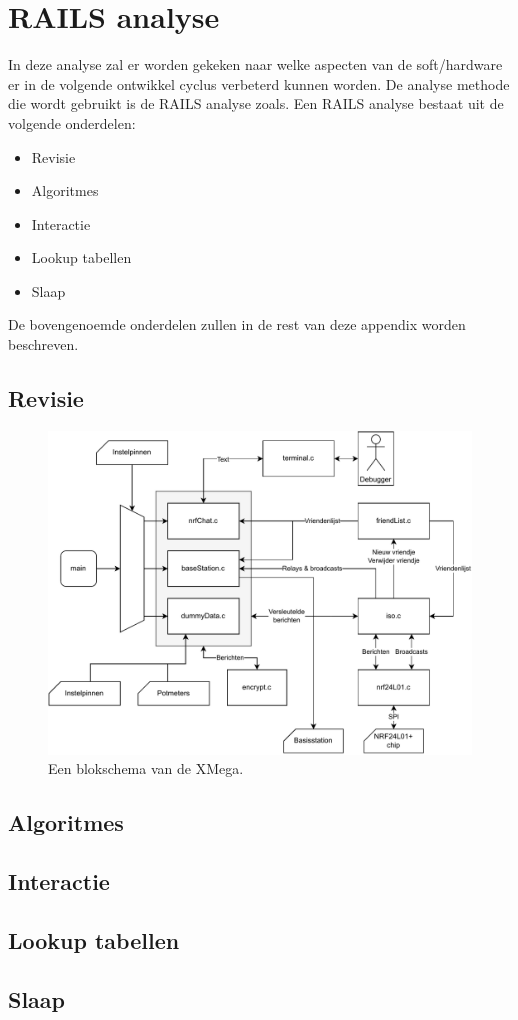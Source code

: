 \section{RAILS analyse} \label{app:railsAnalysis}

In deze analyse zal er worden gekeken naar welke aspecten van de soft/hardware er in de volgende ontwikkel cyclus verbeterd kunnen worden. De analyse methode die wordt gebruikt is de RAILS analyse zoals. Een RAILS analyse bestaat uit de volgende onderdelen:
\begin{itemize}
    \item Revisie
    \item Algoritmes
    \item Interactie
    \item Lookup tabellen
    \item Slaap
\end{itemize}
De bovengenoemde onderdelen zullen in de rest van deze appendix worden beschreven.

\subsection{Revisie}

\begin{figure}[h]
    \centering
    \includegraphics[width=\textwidth]{img/xmegablokshema}
    \caption{Een blokschema van de XMega.}
\end{figure}


\subsection{Algoritmes}


\subsection{Interactie}

\subsection{Lookup tabellen}

\subsection{Slaap}

